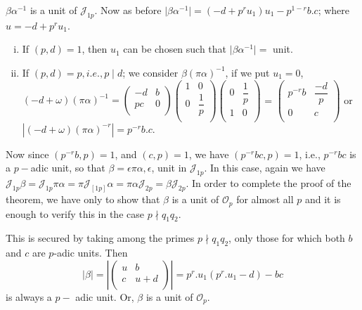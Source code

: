 $\beta \alpha^{-1} $ is a unit of $ \mathcal{J}_{1p} $. Now as
before  $\mid \beta \alpha^{-1} | = (-d + p^r u_1)u_1- p^{1-r} b. c $;
where  $ u = -d + p^r u_1 $. 
\begin{enumerate}[(i)]
\item If $ ( p,d ) = 1 $, then $u_1 $ can be chosen such that $ \mid
  \beta \alpha^{-1} \mid = $ unit. 
\item If $ ( p, d ) = p,i.e.,p \mid d $; we consider $ \beta ( \pi
  \alpha )^{-1} $, if we put  $ u_1 = 0 $, $ (-d + \omega) ( \pi
  \alpha )^{-1}  = \begin{pmatrix} -d&  b \\ pc & 0
    \\ \end{pmatrix}  \begin{pmatrix} 1 &  0 \\ 0 & \dfrac{1}{p}
    \\ \end{pmatrix}  \begin{pmatrix} 0 &  \dfrac{1}{p} \\ 1 & 0
    \\ \end{pmatrix} $ =  $ \begin{pmatrix} p^{-r} b &  \dfrac{-d}{p}
    \\ 0 & c \\ \end{pmatrix} $ or $ | ( -d + \omega ) ( \pi \alpha
  )^{-r}|=p^{-r} b.c $.  
\end{enumerate}  
  
  Now since $ ( p^{-r} b, p ) = 1 $, and $ (c,p) = 1 $, we have $ (
  p^{-r} bc, p ) = 1 $,  i.e., $ p^{-r} bc $ is a $ p- $adic unit, so
  that $ \beta = \epsilon \pi \alpha,  \epsilon$, unit in $
  \mathcal{J}_{1p} $. In this case, again we have $ \mathcal{J}_{1p}
  \beta = \mathcal{J}_{1p} \pi \alpha  = \pi \mathcal{J}_[1p] \alpha  =
  \pi \alpha \mathcal{J}_{2p} = \beta \mathcal{J}_{2p}$. In order to
  complete the proof of the theorem, we have only to show that  $
  \beta $ is  a unit of $ \mathscr{O}_p $ for almost all $p$ and it is
  enough to verify this in the case  $ p \nmid q_1 q_2 $. 
  
This is secured by taking among the  primes $ p \nmid q_1 q_2 $, only
those for which both $b$ and $c$ are $p$-adic units. Then  
$$
\mid \beta \mid = | \begin{pmatrix} u &  b \\ c & u+d \\ \end{pmatrix}
| = p^r.u_1 ( p^r. u_1 -d ) -bc 
$$
is always a $p-$ adic unit. Or, $ \beta $ is a unit of $ \mathscr{O}_p
$. 

